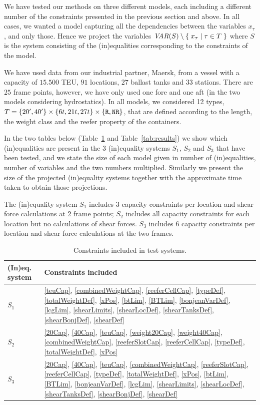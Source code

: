 We have tested our methods on three different models, each including a different number of the constraints presented in the previous section and above. In all cases, we wanted a model capturing all the dependencies between the  variables $x_\tau$, and only those. Hence we project the variables $\mathit{VAR}(S)\setminus \{\;{x_\tau}\;|\;{\tau\in T}\;\}$ where $S$ is the system consisting of the (in)equalities corresponding to the constraints of the model.

We have used data from our industrial partner, Maersk, from a vessel with a capacity of $15.500$ TEU, $91$ locations, $27$ ballast tanks and $33$ stations. There are $25$ frame points, however, we have only used one fore and one aft (in the two models considering hydrostatics). In all models, we considered 12 types, $T = \{20', 40'\}\times \{6t, 21t, 27t\}\times\{\texttt{R}, \texttt{NR}\}$, that are defined according to the length, the weight class and the reefer property of the containers.

In the two tables below (Table~\ref{fig:constraints} and Table~\ref{tab:results}) we show which (in)equalities are present in the 3 (in)equality systems $S_1$, $S_2$ and $S_3$ that have been tested, and we state the size of each model given in number of (in)equalities, number of variables and the two numbers multiplied. Similarly we present the size of the projected (in)equality systems together with the approximate time taken to obtain those projections. 

The (in)equality system $S_1$ includes $3$ capacity constraints per location and shear force calculations at $2$ frame points; $S_2$ includes all capacity constraints for each location but no calculations of shear forces. $S_3$ includes 6 capacity constraints per location and shear force calculations at the two frames.

\begin{table}[H]
\centering
{\renewcommand{\arraystretch}{1.2}
\begin{tabular}[t]{l|p{9cm}}
(In)eq. system&Constraints included\\
\hline
$S_1$& \eqref{teuCap}, \eqref{combinedWeightCap}, \eqref{reeferCellCap}, \eqref{typeDef}, \eqref{totalWeightDef}, \eqref{xPos}, \eqref{btLim}, \eqref{BTLim}, \eqref{bonjeanVarDef},  \eqref{lcgLim}, \eqref{shearLimits}, {\eqref{shearLocDef}}, \eqref{shearTanksDef}, \eqref{shearBonjDef}, \eqref{shearDef}\\
\hline
$S_2$&\eqref{20Cap}, \eqref{40Cap}, \eqref{teuCap}, \eqref{weight20Cap}, \eqref{weight40Cap}, \eqref{combinedWeightCap}, \eqref{reeferSlotCap}, \eqref{reeferCellCap}, \eqref{typeDef}, \eqref{totalWeightDef}, \eqref{xPos}\\
\hline
$S_3$& \eqref{20Cap}, \eqref{40Cap}, \eqref{teuCap}, \eqref{combinedWeightCap}, \eqref{reeferSlotCap}, \eqref{reeferCellCap},  \eqref{typeDef}, \eqref{totalWeightDef}, \eqref{xPos}, \eqref{btLim}, \eqref{BTLim}, \eqref{bonjeanVarDef}, \eqref{lcgLim}, \eqref{shearLimits}, {\eqref{shearLocDef}}, \eqref{shearTanksDef}, \eqref{shearBonjDef},  \eqref{shearDef}\\
\end{tabular}
}
\caption{Constraints included in test systems.}\label{fig:constraints}
\end{table}

